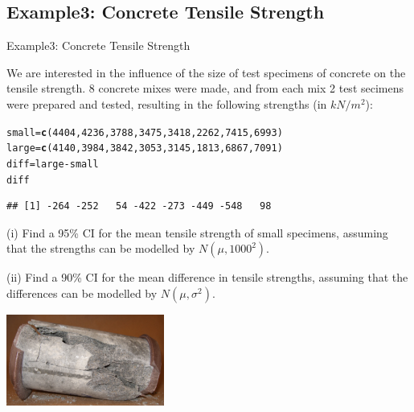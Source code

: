 \documentclass[t,xcolor=pdftex,dvipsnames,table]{beamer}
\makeatletter
\newcommand{\hlnum}[1]{\textcolor[rgb]{0.686,0.059,0.569}{#1}}%
\newcommand{\hlopt}[1]{\textcolor[rgb]{0,0,0}{#1}}%
\newcommand{\hlstd}[1]{\textcolor[rgb]{0.345,0.345,0.345}{#1}}%
\newcommand{\hlkwb}[1]{\textcolor[rgb]{0.69,0.353,0.396}{#1}}%
\newcommand{\hlkwd}[1]{\textcolor[rgb]{0.737,0.353,0.396}{\textbf{#1}}}%
\newenvironment{kframe}{%
 \def\at@end@of@kframe{}%
 \ifinner\ifhmode%
  \def\at@end@of@kframe{\end{minipage}}%
  \begin{minipage}{\columnwidth}%
 \fi\fi%
 \def\FrameCommand##1{\hskip\@totalleftmargin \hskip-\fboxsep
 \colorbox{shadecolor}{##1}\hskip-\fboxsep
     \hskip-\linewidth \hskip-\@totalleftmargin \hskip\columnwidth}%
 \MakeFramed {\advance\hsize-\width
   \@totalleftmargin\z@ \linewidth\hsize
   \@setminipage}}%
 {\par\unskip\endMakeFramed%
 \at@end@of@kframe}
\newenvironment{knitrout}{}{} %
\makeatother
\begin{document}
\subsection[Examples]{Example3: Concrete Tensile Strength}
\begin{frame}[fragile]{Example3: Concrete Tensile Strength}

We are interested in the influence of the size of test specimens of concrete on the tensile strength. 
8 concrete mixes were made, and from each mix 2 test secimens were prepared and tested, resulting in the following strengths (in $kN/m^2$):

\begin{knitrout}
\color{fgcolor}\begin{kframe}
\begin{alltt}
\hlstd{small}\hlkwb{=}\hlkwd{c}\hlstd{(}\hlnum{4404}\hlstd{,}\hlnum{4236}\hlstd{,}\hlnum{3788}\hlstd{,}\hlnum{3475}\hlstd{,}\hlnum{3418}\hlstd{,}\hlnum{2262}\hlstd{,}\hlnum{7415}\hlstd{,}\hlnum{6993}\hlstd{)}
\hlstd{large}\hlkwb{=}\hlkwd{c}\hlstd{(}\hlnum{4140}\hlstd{,}\hlnum{3984}\hlstd{,}\hlnum{3842}\hlstd{,}\hlnum{3053}\hlstd{,}\hlnum{3145}\hlstd{,}\hlnum{1813}\hlstd{,}\hlnum{6867}\hlstd{,}\hlnum{7091}\hlstd{)}
\hlstd{diff}\hlkwb{=}\hlstd{large}\hlopt{-}\hlstd{small}
\hlstd{diff}
\end{alltt}
\begin{verbatim}
## [1] -264 -252   54 -422 -273 -449 -548   98
\end{verbatim}
\end{kframe}
\end{knitrout}

\end{frame}


\begin{frame}[fragile]{}

(i) Find a 95\% CI for the mean tensile strength of small specimens, assuming that the strengths can be modelled by $N(\mu,1000^2)$. 

\vspace{.5cm}
(ii) Find a 90\% CI for the mean difference in tensile strengths, assuming that the differences can be modelled by $N(\mu,\sigma^2)$. 

\begin{center}
\includegraphics[height=3cm]{../images/Concrete.jpg}
\end{center}
\end{frame}
\end{document}
